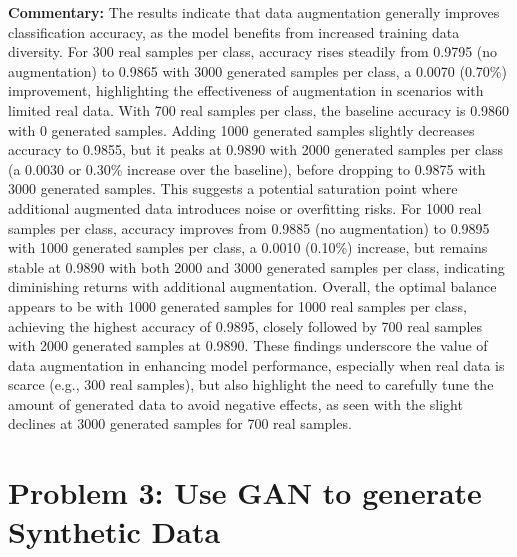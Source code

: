 \documentclass[12pt]{article}
\begin{document}
\textbf{Commentary:} The results indicate that data augmentation generally improves classification accuracy, as the model benefits from increased training data diversity. For 300 real samples per class, accuracy rises steadily from 0.9795 (no augmentation) to 0.9865 with 3000 generated samples per class, a 0.0070 (0.70\%) improvement, highlighting the effectiveness of augmentation in scenarios with limited real data. With 700 real samples per class, the baseline accuracy is 0.9860 with 0 generated samples. Adding 1000 generated samples slightly decreases accuracy to 0.9855, but it peaks at 0.9890 with 2000 generated samples per class (a 0.0030 or 0.30\% increase over the baseline), before dropping to 0.9875 with 3000 generated samples. This suggests a potential saturation point where additional augmented data introduces noise or overfitting risks. For 1000 real samples per class, accuracy improves from 0.9885 (no augmentation) to 0.9895 with 1000 generated samples per class, a 0.0010 (0.10\%) increase, but remains stable at 0.9890 with both 2000 and 3000 generated samples per class, indicating diminishing returns with additional augmentation. Overall, the optimal balance appears to be with 1000 generated samples for 1000 real samples per class, achieving the highest accuracy of 0.9895, closely followed by 700 real samples with 2000 generated samples at 0.9890. These findings underscore the value of data augmentation in enhancing model performance, especially when real data is scarce (e.g., 300 real samples), but also highlight the need to carefully tune the amount of generated data to avoid negative effects, as seen with the slight declines at 3000 generated samples for 700 real samples.
\section{Problem 3: Use GAN to generate Synthetic Data}
\end{document}
